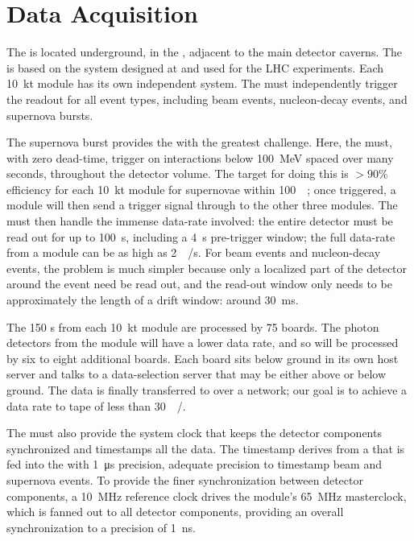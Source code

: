 \section{Data Acquisition}
\label{sec:fdsp-exec-daq}

The  is located underground, in the , adjacent to the main detector caverns. The  is based on the  system designed at  and used for the LHC  experiments. Each \SI{10}{\kilo\tonne} module has its own independent  system. The  must independently trigger the  readout for all event types, including beam events, nucleon-decay events, and supernova bursts.

The supernova burst provides the  with the greatest challenge. Here, the  must, with zero dead-time, trigger on interactions below \SI{100}{\mega\electronvolt} spaced over many seconds, throughout the detector volume. The target for doing this is $>\!90\%$ efficiency for each \SI{10}{\kilo\tonne} module for supernovae within \SI{100}{\kilo\parsec}; once triggered, a module will then send a trigger signal through to the other three modules. The  must then handle the immense data-rate involved: the entire detector must be read out for up to \SI{100}{\second}, including a \SI{4}{\second} pre-trigger window; the full data-rate from a module can be as high as \SI{2}{\tera\byte/\second}. For beam events and nucleon-decay events, the problem is much simpler because only a localized part of the detector around the event need be read out, and the read-out window only needs to be approximately the length of a drift window: around \SI{30}{\milli\second}.

The 150 s from each \SI{10}{\kilo\tonne} module are processed by 75  boards. The photon detectors from the module will have a lower data rate, and so will be processed by six to eight additional  boards. Each  board sits below ground in its own host server and talks to a data-selection server that may be either above or below ground. The data is finally transferred to  over a network; our goal is to achieve a data rate to tape of less than \SI{30}{\peta\byte/\year}.

The  must also provide the system clock that keeps the detector components synchronized and timestamps all the data. The timestamp derives from a   that is fed into the  with \SI{1}{\micro\second} precision, adequate precision to timestamp beam and supernova events. To provide the finer synchronization between detector components, a \SI{10}{\mega\hertz} reference clock drives the module's \SI{65}{\mega\hertz} masterclock, which is fanned out to all detector components, providing an overall synchronization to a precision of \SI{1}{\nano\second}.



